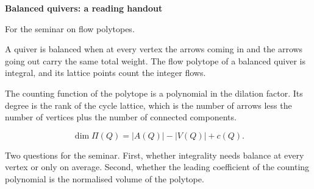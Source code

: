 \documentclass[11pt]{article}
\begin{document}
\noindent\textbf{Balanced quivers: a reading handout}

\medskip
\noindent For the seminar on flow polytopes.

\bigskip
A quiver is balanced when at every vertex the arrows coming in and the arrows going out carry the same total weight. The flow polytope of a balanced quiver is integral, and its lattice points count the integer flows.

The counting function of the polytope is a polynomial in the dilation factor. Its degree is the rank of the cycle lattice, which is the number of arrows less the number of vertices plus the number of connected components.

\begin{equation*}
  \dim \Pi(Q) = |A(Q)| - |V(Q)| + c(Q).
\end{equation*}

Two questions for the seminar. First, whether integrality needs balance at every vertex or only on average. Second, whether the leading coefficient of the counting polynomial is the normalised volume of the polytope.
\end{document}
